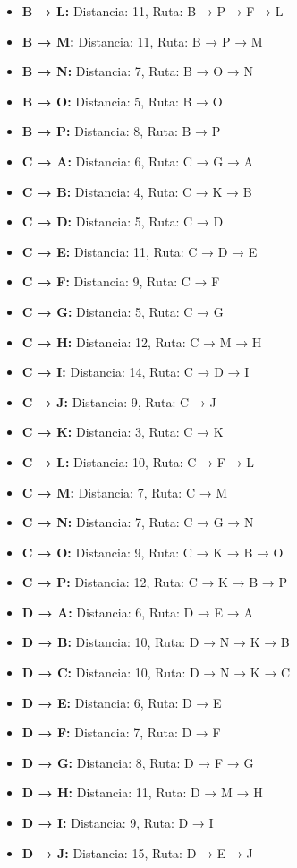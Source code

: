 \documentclass[12pt]{article}
\begin{document}
\begin{itemize}
\item \textbf{B → L:} Distancia: 11, Ruta: B → P → F → L
\item \textbf{B → M:} Distancia: 11, Ruta: B → P → M
\item \textbf{B → N:} Distancia: 7, Ruta: B → O → N
\item \textbf{B → O:} Distancia: 5, Ruta: B → O
\item \textbf{B → P:} Distancia: 8, Ruta: B → P
\item \textbf{C → A:} Distancia: 6, Ruta: C → G → A
\item \textbf{C → B:} Distancia: 4, Ruta: C → K → B
\item \textbf{C → D:} Distancia: 5, Ruta: C → D
\item \textbf{C → E:} Distancia: 11, Ruta: C → D → E
\item \textbf{C → F:} Distancia: 9, Ruta: C → F
\item \textbf{C → G:} Distancia: 5, Ruta: C → G
\item \textbf{C → H:} Distancia: 12, Ruta: C → M → H
\item \textbf{C → I:} Distancia: 14, Ruta: C → D → I
\item \textbf{C → J:} Distancia: 9, Ruta: C → J
\item \textbf{C → K:} Distancia: 3, Ruta: C → K
\item \textbf{C → L:} Distancia: 10, Ruta: C → F → L
\item \textbf{C → M:} Distancia: 7, Ruta: C → M
\item \textbf{C → N:} Distancia: 7, Ruta: C → G → N
\item \textbf{C → O:} Distancia: 9, Ruta: C → K → B → O
\item \textbf{C → P:} Distancia: 12, Ruta: C → K → B → P
\item \textbf{D → A:} Distancia: 6, Ruta: D → E → A
\item \textbf{D → B:} Distancia: 10, Ruta: D → N → K → B
\item \textbf{D → C:} Distancia: 10, Ruta: D → N → K → C
\item \textbf{D → E:} Distancia: 6, Ruta: D → E
\item \textbf{D → F:} Distancia: 7, Ruta: D → F
\item \textbf{D → G:} Distancia: 8, Ruta: D → F → G
\item \textbf{D → H:} Distancia: 11, Ruta: D → M → H
\item \textbf{D → I:} Distancia: 9, Ruta: D → I
\item \textbf{D → J:} Distancia: 15, Ruta: D → E → J

\end{itemize}
\end{document}
